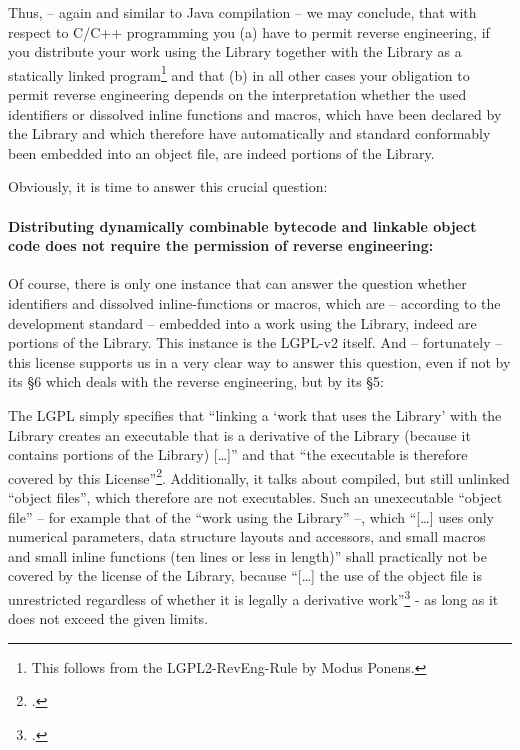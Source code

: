 Thus, -- again and similar to Java compilation -- we may conclude, that with
respect to C/C++ programming you (a) have to permit reverse engineering, if you
distribute your work using the Library together with the Library as a statically
linked program\footnote{This follows from the LGPL2-RevEng-Rule by Modus
Ponens.} and that (b) in all other cases your obligation to permit reverse
engineering depends on the interpretation whether the used identifiers or
dissolved inline functions and macros, which have been declared by the Library
and which therefore have automatically and standard conformably been embedded
into an object file, are indeed portions of the Library.

Obviously, it is time to answer this crucial question:
\label{RevEngLgplSection5Derivation}
\paragraph{Distributing dynamically combinable bytecode and linkable object code
does not require the permission of reverse engineering:} 
\label{RevEngDistributeDynamicallyLinkedCode}
Of course, there is only one instance that can answer the question whether
identifiers and dissolved inline-functions or macros, which are -- according to
the development standard -- embedded into a work using the Library, indeed are
portions of the Library. This instance is the LGPL-v2 itself. And -- fortunately
-- this license supports us in a very clear way to answer this question, even if
not by its §6 which deals with the reverse engineering, but by its §5:

The LGPL simply specifies that \enquote{linking a \enquote{work that uses the
Library} with the Library creates an executable that is a derivative of the
Library (because it contains portions of the Library) [\ldots]} and that
\enquote{the executable is therefore covered by this
License}\footcite[cf.][\nopage wp. §5]{Lgpl21OsiLicense1999a}. Additionally, it
talks about compiled, but still unlinked \enquote{object files}, which therefore
are not executables. Such an unexecutable \enquote{object file} -- for example
that of the \enquote{work using the Library} --, which \enquote{[\ldots] uses
only numerical parameters, data structure layouts and accessors, and small
macros and small inline functions (ten lines or less in length)} shall
practically not be covered by the license of the Library, because
\enquote{[\ldots] the use of the object file is unrestricted regardless of
whether it is legally a derivative work}\footcite[cf.][\nopage wp.
§5]{Lgpl21OsiLicense1999a} - as long as it does not exceed the given limits.

